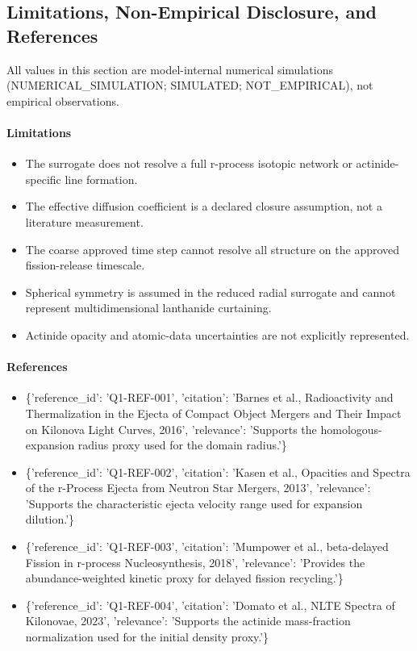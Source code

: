 \documentclass[11pt]{article}
\begin{document}
\subsection{Limitations, Non-Empirical Disclosure, and References}

\noindent All values in this section are model-internal numerical simulations (NUMERICAL\_SIMULATION; SIMULATED; NOT\_EMPIRICAL), not empirical observations.

\paragraph{Limitations}
\begin{itemize}\raggedright
\item The surrogate does not resolve a full r-process isotopic network or actinide-specific line formation.
\item The effective diffusion coefficient is a declared closure assumption, not a literature measurement.
\item The coarse approved time step cannot resolve all structure on the approved fission-release timescale.
\item Spherical symmetry is assumed in the reduced radial surrogate and cannot represent multidimensional lanthanide curtaining.
\item Actinide opacity and atomic-data uncertainties are not explicitly represented.
\end{itemize}

\paragraph{References}
\begin{itemize}\raggedright
\item \{'reference\_\allowbreak{}id': 'Q1-REF-001', 'citation': 'Barnes et al., Radioactivity and Thermalization in the Ejecta of Compact Object Mergers and Their Impact on Kilonova Light Curves, 2016', 'relevance': 'Supports the homologous-expansion radius proxy used for the domain radius.'\}
\item \{'reference\_\allowbreak{}id': 'Q1-REF-002', 'citation': 'Kasen et al., Opacities and Spectra of the r-Process Ejecta from Neutron Star Mergers, 2013', 'relevance': 'Supports the characteristic ejecta velocity range used for expansion dilution.'\}
\item \{'reference\_\allowbreak{}id': 'Q1-REF-003', 'citation': 'Mumpower et al., beta-delayed Fission in r-process Nucleosynthesis, 2018', 'relevance': 'Provides the abundance-weighted kinetic proxy for delayed fission recycling.'\}
\item \{'reference\_\allowbreak{}id': 'Q1-REF-004', 'citation': 'Domato et al., NLTE Spectra of Kilonovae, 2023', 'relevance': 'Supports the actinide mass-fraction normalization used for the initial density proxy.'\}
\end{itemize}
\end{document}
